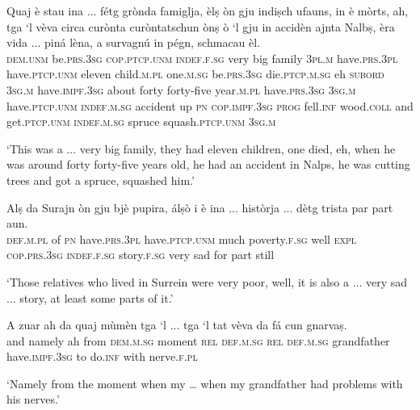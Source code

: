 \begin{linenumbers}
\gll Quaj è stau ina ... fétg grònda famiglja, èlṣ òn gju indiṣch ufauns, in è mòrts, ah, tga `l vèva circa curònta curòntatschun ònṣ ò `l gju in accidèn ajnta Nalbṣ, èra vida ... piná lèna, a survagnú in pégn, schmacau èl.   \\
  \textsc{dem.unm}  be.\textsc{prs.3sg}  \textsc{cop.ptcp.unm}  \textsc{indef.f.sg} {} very big family \textsc{3pl.m} have.\textsc{prs.3pl} have.\textsc{ptcp.unm} eleven child.\textsc{m.pl} one.\textsc{m.sg} be.\textsc{prs.3sg} die.\textsc{ptcp.m.sg} eh \textsc{subord} \textsc{3sg.m} have.\textsc{impf.3sg} about forty forty-five year.\textsc{m.pl} have.\textsc{prs.3sg} \textsc{3sg.m} have.\textsc{ptcp.unm} \textsc{indef.m.sg} accident up \textsc{pn} \textsc{cop.impf.3sg} \textsc{prog} {} fell.\textsc{inf} wood.\textsc{coll} and get.\textsc{ptcp.unm} \textsc{indef.m.sg} spruce squash.\textsc{ptcp.unm} \textsc{3sg.m} \\
\end{linenumbers}
\medskip
\glt `This was a ... very big family, they had eleven children, one died, eh, when he was around forty forty-five years old, he had an accident in Nalps, he was cutting trees and got a spruce, squashed him.'
\medskip

\begin{linenumbers}
\gll Alṣ da Surajn òn gju bjè pupira, álṣò i è ina ... històrja ... dètg trista par part aun.\\
    \textsc{def.m.pl} of \textsc{pn} have.\textsc{prs.3pl} have.\textsc{ptcp.unm} much poverty.\textsc{f.sg} well \textsc{expl} \textsc{cop.prs.3sg} \textsc{indef.f.sg} {} story.\textsc{f.sg} {} very sad for part still \\
\end{linenumbers}
\medskip
\glt `Those relatives who lived in Surrein were very poor, well, it is also a ... very sad ... story, at least some parts of it.'
\medskip

\begin{linenumbers}
\gll A zuar ah da quaj mùmèn tga `l ... tga `l tat vèva da fá cun gnarvaṣ. \\
and namely ah from \textsc{dem.m.sg} moment \textsc{rel} \textsc{def.m.sg} {} \textsc{rel} \textsc{def.m.sg} grandfather have.\textsc{impf.3sg} to do.\textsc{inf} with nerve.\textsc{f.pl} \\ 
\end{linenumbers}
\medskip
\glt `Namely from the moment when my … when my grandfather had problems with his nerves.'
\medskip

